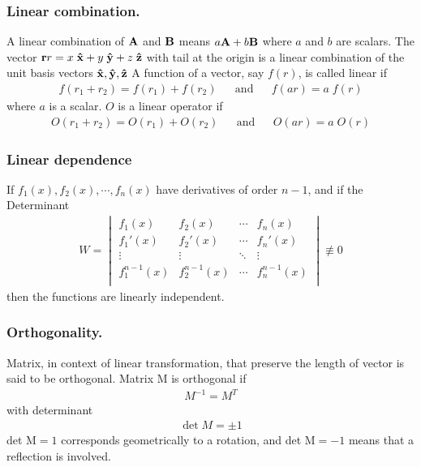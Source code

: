 \documentclass[../main.tex]{subfiles}
\begin{document}
\subsubsection*{Linear combination.} A linear combination of $\mathbf{A}$ and $\mathbf{B}$ means $a\mathbf{A} + b\mathbf{B}$ where $a$ and $b$ are scalars.
The vector $\mathbf{r}r = x\;\mathbf{\hat{x}}+y\;\mathbf{\hat{y}}+z\;\mathbf{\hat{z}}$ with tail at the origin is a linear combination of the unit basis vectors $\mathbf{\hat{x}},\mathbf{\hat{y}},\mathbf{\hat{z}}$
A function of a vector, say $f (r)$, is called linear if
\begin{align*}
	f(r_1+r_2)= f(r_1)+ f(r_2) &  & \mathrm{and} &  & f(ar)=a\;f(r)
\end{align*}
where $a$ is a scalar. $O$ is a linear operator if
\begin{align*}
	O(r_1+r_2)= O(r_1)+ O(r_2) &  & \mathrm{and} &  & O(ar)=a\;O(r)
\end{align*}

\subsubsection*{Linear dependence}If $f_1(x), f_2(x),\cdots, f_n(x)$ have derivatives of order $n - 1$, and if the Determinant
\begin{align*}
	W=\begin{vmatrix}
		  f_1(x)       & f_2(x)       & \cdots & f_n(x)       \\
		  f_1'(x)      & f_2'(x)      & \cdots & f_n'(x)      \\
		  \vdots       & \vdots       & \ddots & \vdots       \\
		  f_1^{n-1}(x) & f_2^{n-1}(x) & \cdots & f_n^{n-1}(x) \\
	  \end{vmatrix}\not\equiv0
\end{align*}then the functions are linearly independent.

\subsubsection*{Orthogonality.} Matrix, in context of linear transformation, that preserve the length of vector is said to be orthogonal.
Matrix M is orthogonal if
\begin{align*}
	M^{-1}=M^T
\end{align*}
with determinant
\begin{align*}
	\det M = \pm 1
\end{align*}
det $\text{M} = 1$ corresponds geometrically to a rotation, and det $\text{M} = -1$ means that a reflection is involved.
\end{document}
